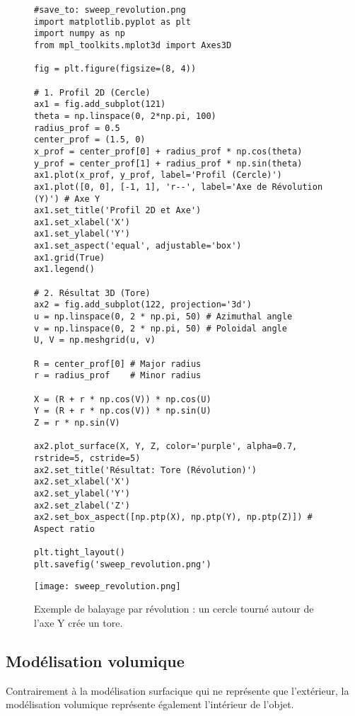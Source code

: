 \documentclass{article}
\begin{document}
\begin{figure}[H]
    \centering
    \begin{verbatim}
#save_to: sweep_revolution.png
import matplotlib.pyplot as plt
import numpy as np
from mpl_toolkits.mplot3d import Axes3D

fig = plt.figure(figsize=(8, 4))

# 1. Profil 2D (Cercle)
ax1 = fig.add_subplot(121)
theta = np.linspace(0, 2*np.pi, 100)
radius_prof = 0.5
center_prof = (1.5, 0)
x_prof = center_prof[0] + radius_prof * np.cos(theta)
y_prof = center_prof[1] + radius_prof * np.sin(theta)
ax1.plot(x_prof, y_prof, label='Profil (Cercle)')
ax1.plot([0, 0], [-1, 1], 'r--', label='Axe de Révolution (Y)') # Axe Y
ax1.set_title('Profil 2D et Axe')
ax1.set_xlabel('X')
ax1.set_ylabel('Y')
ax1.set_aspect('equal', adjustable='box')
ax1.grid(True)
ax1.legend()

# 2. Résultat 3D (Tore)
ax2 = fig.add_subplot(122, projection='3d')
u = np.linspace(0, 2 * np.pi, 50) # Azimuthal angle
v = np.linspace(0, 2 * np.pi, 50) # Poloidal angle
U, V = np.meshgrid(u, v)

R = center_prof[0] # Major radius
r = radius_prof    # Minor radius

X = (R + r * np.cos(V)) * np.cos(U)
Y = (R + r * np.cos(V)) * np.sin(U)
Z = r * np.sin(V)

ax2.plot_surface(X, Y, Z, color='purple', alpha=0.7, rstride=5, cstride=5)
ax2.set_title('Résultat: Tore (Révolution)')
ax2.set_xlabel('X')
ax2.set_ylabel('Y')
ax2.set_zlabel('Z')
ax2.set_box_aspect([np.ptp(X), np.ptp(Y), np.ptp(Z)]) # Aspect ratio

plt.tight_layout()
plt.savefig('sweep_revolution.png')
    \end{verbatim}
    \texttt{[image: sweep\_revolution.png]}
    \caption{Exemple de balayage par révolution : un cercle tourné autour de l'axe Y crée un tore.}
    \label{fig:sweep_revolution}
\end{figure}


\subsection{Modélisation volumique}

Contrairement à la modélisation surfacique qui ne représente que l'extérieur, la modélisation volumique représente également l'intérieur de l'objet.
\end{document}
